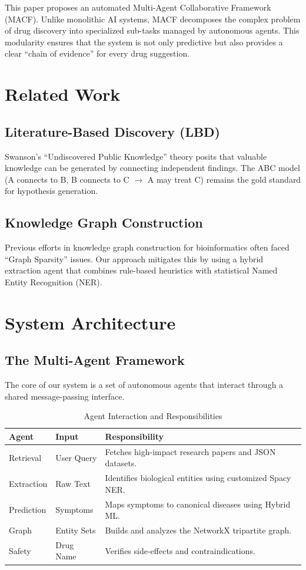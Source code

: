 \documentclass[conference]{IEEEtran}
\begin{document}
This paper proposes an automated Multi-Agent Collaborative Framework (MACF). Unlike monolithic AI systems, MACF decomposes the complex problem of drug discovery into specialized sub-tasks managed by autonomous agents. This modularity ensures that the system is not only predictive but also provides a clear ``chain of evidence'' for every drug suggestion.

\section{Related Work}
\subsection{Literature-Based Discovery (LBD)}
Swanson's ``Undiscovered Public Knowledge'' theory posits that valuable knowledge can be generated by connecting independent findings. The ABC model (A connects to B, B connects to C $\rightarrow$ A may treat C) remains the gold standard for hypothesis generation.

\subsection{Knowledge Graph Construction}
Previous efforts in knowledge graph construction for bioinformatics often faced ``Graph Sparsity'' issues. Our approach mitigates this by using a hybrid extraction agent that combines rule-based heuristics with statistical Named Entity Recognition (NER).

\section{System Architecture}
\subsection{The Multi-Agent Framework}
The core of our system is a set of autonomous agents that interact through a shared message-passing interface.

\begin{table}[htbp]
\caption{Agent Interaction and Responsibilities}
\centering
\begin{tabular}{|l|l|p{3.5cm}|}
\hline
\textbf{Agent} & \textbf{Input} & \textbf{Responsibility} \\
\hline
Retrieval & User Query & Fetches high-impact research papers and JSON datasets. \\
\hline
Extraction & Raw Text & Identifies biological entities using customized Spacy NER. \\
\hline
Prediction & Symptoms & Maps symptoms to canonical diseases using Hybrid ML. \\
\hline
Graph & Entity Sets & Builds and analyzes the NetworkX tripartite graph. \\
\hline
Safety & Drug Name & Verifies side-effects and contraindications. \\
\hline
\end{tabular}
\end{table}
\end{document}
